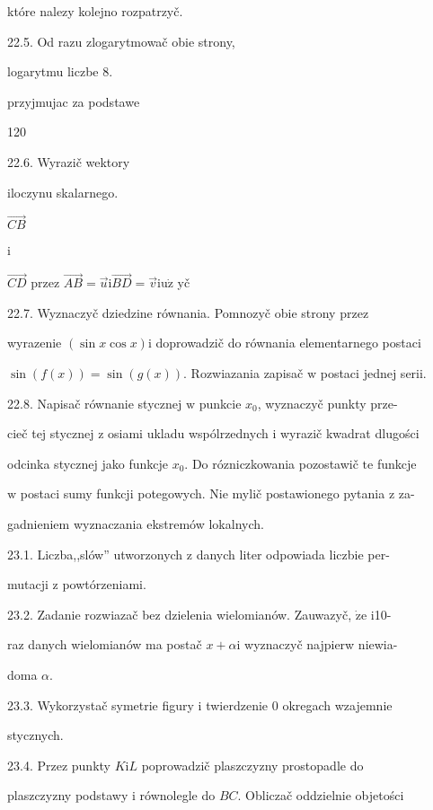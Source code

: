 \documentclass[a4paper,12pt]{article}
\begin{document}
które nalezy kolejno rozpatrzyč.

22.5. Od razu zlogarytmowač obie strony,

logarytmu liczbe 8.

przyjmujac za podstawe





120

22.6. Wyrazič wektory

iloczynu skalarnego.

$\vec{CB}$

i

$\vec{CD}$ przez $\vec{AB}=\vec{u} \mathrm{i} \vec{BD}=\vec{v}\mathrm{i}\mathrm{u}\dot{\mathrm{z}}$ yč

22.7. Wyznaczyč dziedzine równania. Pomnozyč obie strony przez

wyrazenie $(\sin x\cos x) \mathrm{i}$ doprowadzič do równania elementarnego postaci

$\sin(f(x))=\sin(g(x))$. Rozwiazania zapisač $\mathrm{w}$ postaci jednej serii.

22.8. Napisač równanie stycznej $\mathrm{w}$ punkcie $x_{0}$, wyznaczyč punkty prze-

cieč tej stycznej $\mathrm{z}$ osiami ukladu wspólrzednych $\mathrm{i}$ wyrazič kwadrat dlugości

odcinka stycznej jako funkcje $x_{0}$. Do rózniczkowania pozostawič $\mathrm{t}\mathrm{e}$ funkcje

$\mathrm{w}$ postaci sumy funkcji potegowych. Nie mylič postawionego pytania $\mathrm{z}$ za-

gadnieniem wyznaczania ekstremów lokalnych.

23.1. Liczba,,slów'' utworzonych $\mathrm{z}$ danych liter odpowiada liczbie per-

mutacji $\mathrm{z}$ powtórzeniami.

23.2. Zadanie rozwiazač bez dzielenia wielomianów. Zauwazyč, $\dot{\mathrm{z}}\mathrm{e}$ i10-

raz danych wielomianów ma postač $ x+\alpha \mathrm{i}$ wyznaczyč najpierw niewia-

doma $\alpha.$

23.3. Wykorzystač symetrie figury $\mathrm{i}$ twierdzenie $0$ okregach wzajemnie

stycznych.

23.4. Przez punkty $K \mathrm{i} L$ poprowadzič plaszczyzny prostopadle do

plaszczyzny podstawy $\mathrm{i}$ równolegle do $BC$. Obliczač oddzielnie objetości
\end{document}

